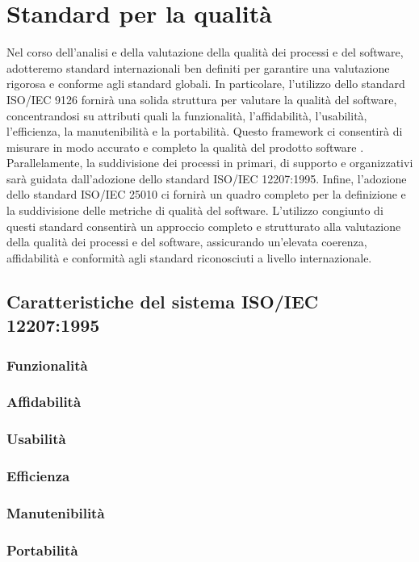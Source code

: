 \section{Standard per la qualità}
Nel corso dell’analisi e della valutazione della qualità dei processi e del software, adotteremo standard internazionali ben definiti per garantire una valutazione rigorosa e conforme agli standard globali. In particolare, l’utilizzo dello standard ISO/IEC 9126 fornirà una solida struttura per valutare la qualità del software, concentrandosi su attributi quali la funzionalità, l’affidabilità, l’usabilità, l’efficienza, la manutenibilità e la portabilità. Questo framework ci consentirà di misurare in modo accurato e completo la qualità del prodotto software .
Parallelamente, la suddivisione dei processi in primari, di supporto e organizzativi sarà guidata dall’adozione dello standard ISO/IEC 12207:1995. Infine, l’adozione dello standard ISO/IEC 25010 ci fornirà un quadro completo per la definizione e la suddivisione delle metriche di qualità del software. L’utilizzo congiunto di questi standard consentirà un approccio completo e strutturato alla valutazione della qualità dei processi e del software, assicurando un’elevata coerenza, affidabilità e conformità agli standard riconosciuti a livello internazionale.
\subsection{Caratteristiche del sistema ISO/IEC 12207:1995}
\subsubsection{Funzionalità}
\subsubsection{Affidabilità}
\subsubsection{Usabilità}
\subsubsection{Efficienza}
\subsubsection{Manutenibilità}
\subsubsection{Portabilità}
